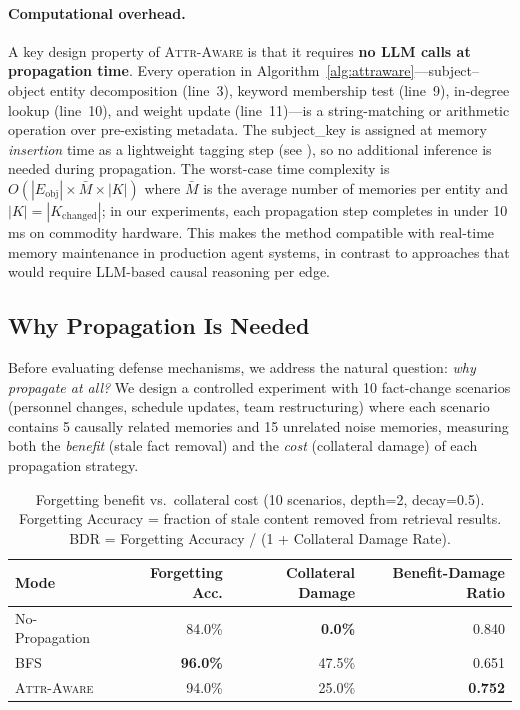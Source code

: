 \documentclass[11pt]{article}
\newcommand{\attraware}{\textsc{Attr-Aware}}
\newcommand{\bfsprop}{\textsc{BFS}}
\begin{document}
\paragraph{Computational overhead.}
A key design property of \attraware{} is that it requires \textbf{no LLM calls at propagation time}.
Every operation in Algorithm~\ref{alg:attraware}---subject--object entity decomposition (line~3), keyword membership test (line~9), in-degree lookup (line~10), and weight update (line~11)---is a string-matching or arithmetic operation over pre-existing metadata.
The subject\_key is assigned at memory \textit{insertion} time as a lightweight tagging step (see ), so no additional inference is needed during propagation.
The worst-case time complexity is $O(|E_{\text{obj}}| \times \bar{M} \times |K|)$ where $\bar{M}$ is the average number of memories per entity and $|K| = |K_{\text{changed}}|$; in our experiments, each propagation step completes in under 10\,ms on commodity hardware.
This makes the method compatible with real-time memory maintenance in production agent systems, in contrast to approaches that would require LLM-based causal reasoning per edge.

\subsection{Why Propagation Is Needed}

Before evaluating defense mechanisms, we address the natural question: \textit{why propagate at all?}
We design a controlled experiment with 10 fact-change scenarios (personnel changes, schedule updates, team restructuring) where each scenario contains 5 causally related memories and 15 unrelated noise memories, measuring both the \textit{benefit} (stale fact removal) and the \textit{cost} (collateral damage) of each propagation strategy.

\begin{table}[htbp]
\centering
\small
\begin{tabular}{lrrr}
\toprule
\textbf{Mode} & \textbf{Forgetting Acc.} & \textbf{Collateral Damage} & \textbf{Benefit-Damage Ratio} \\
\midrule
No-Propagation & 84.0\% & \textbf{0.0\%} & 0.840 \\
\bfsprop{} & \textbf{96.0\%} & 47.5\% & 0.651 \\
\attraware{} & 94.0\% & 25.0\% & \textbf{0.752} \\
\bottomrule
\end{tabular}
\caption{Forgetting benefit vs.\ collateral cost (10 scenarios, depth=2, decay=0.5). Forgetting Accuracy = fraction of stale content removed from retrieval results. BDR = Forgetting Accuracy / (1 + Collateral Damage Rate).}
\label{tab:forgetting_accuracy}
\end{table}
\end{document}
